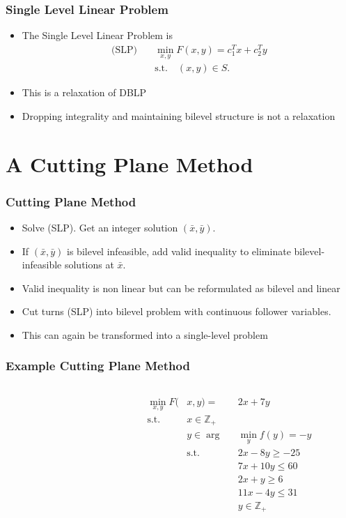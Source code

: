\documentclass[11pt]{beamer}
\begin{document}
\begin{frame}
	\frametitle{Single Level Linear Problem}
	\begin{itemize}
	\item The Single Level Linear Problem is 
	\begin{align*}
		\text{(SLP)} \quad &\min_{x,y} F(x,y) = c_1^Tx +c_2^Ty \\
		&\text{s.t.} \quad (x,y) \in S.
	\end{align*}
	\item This is a relaxation of DBLP
	\item Dropping integrality and maintaining bilevel structure is not a relaxation
	\end{itemize}
\end{frame}

\section{A Cutting Plane Method}
\begin{frame}
	\frametitle{Cutting Plane Method}
	\begin{itemize}
		\item Solve (SLP). Get an integer solution $(\bar x, \bar y)$.
		\item If $(\bar x, \bar y)$ is bilevel infeasible, add valid inequality to eliminate bilevel-infeasible solutions at $\bar x$.
		\item Valid inequality is non linear but can be reformulated as bilevel and linear
		\item Cut turns (SLP) into bilevel problem with continuous follower variables. 
		\item This can again be transformed into a single-level problem
	\end{itemize}
\end{frame}

\begin{frame}
	\frametitle{Example Cutting Plane Method}
	\begin{columns}[T] %
		\begin{column}{.48\textwidth}
			
		\end{column}%
		\hfill%
		\begin{column}{.48\textwidth}
			\begin{alignat*}{2}
			\min_{x,y} F(&x,y) =&& 2x + 7y \\
			\text{s.t.}\quad &x \in \mathbb{Z}_+&& \\
			&y \in \arg&& \min_y f(y) = -y \\
			&\text{s.t.}\quad &&2x - 8y \ge -25 \\
			& &&7x + 10y \le 60 \\
			& &&2x + y \ge 6 \\
			& &&11x - 4y \le 31 \\
			& &&y \in \mathbb{Z}_+ 
			\end{alignat*}
		\end{column}%
	\end{columns}
	\end{frame}
	
\end{document}

